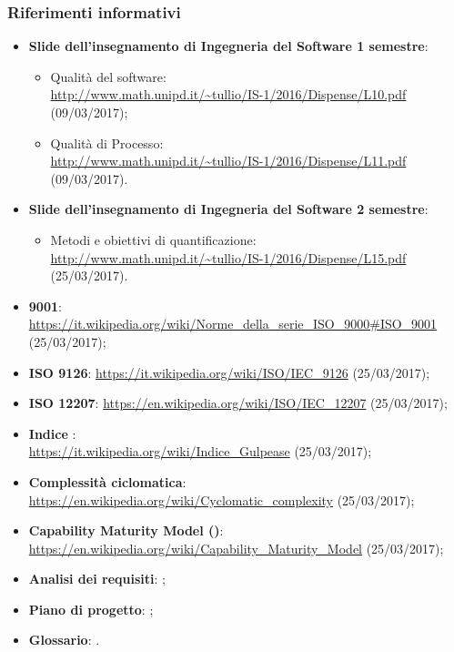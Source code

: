 \documentclass[../PianoDiQualifica.tex]{subfiles}
\begin{document}
			\subsubsection{Riferimenti informativi}	
				\begin{itemize}
					\item \textbf{Slide dell'insegnamento di Ingegneria del Software
					1 semestre}:
						\begin{itemize}
							\item Qualità del software:\\
							\url{http://www.math.unipd.it/~tullio/IS-1/2016/Dispense/L10.pdf} (09/03/2017);
							\item Qualità di Processo:\\
							\url{http://www.math.unipd.it/~tullio/IS-1/2016/Dispense/L11.pdf} (09/03/2017).
						\end{itemize}
					\item \textbf{Slide dell'insegnamento di Ingegneria del Software
					2 semestre}:
						\begin{itemize}
							\item Metodi e obiettivi di quantificazione:\\
							\url{http://www.math.unipd.it/~tullio/IS-1/2016/Dispense/L15.pdf} (25/03/2017).
						\end{itemize}
					\item \textbf{ 9001}:\\
					\url{https://it.wikipedia.org/wiki/Norme_della_serie_ISO_9000#ISO_9001} (25/03/2017);
					\item \textbf{ISO 9126}: \url{https://it.wikipedia.org/wiki/ISO/IEC_9126} (25/03/2017);
					\item \textbf{ISO 12207}: \url{https://en.wikipedia.org/wiki/ISO/IEC_12207} (25/03/2017);
					\item \textbf{Indice }:\\
					\url{https://it.wikipedia.org/wiki/Indice_Gulpease} (25/03/2017);
					\item \textbf{Complessità ciclomatica}:\\
					\url{https://en.wikipedia.org/wiki/Cyclomatic_complexity} (25/03/2017);
					\item \textbf{Capability Maturity Model ()}:\\
					\url{https://en.wikipedia.org/wiki/Capability_Maturity_Model} (25/03/2017);
					\item \textbf{Analisi dei requisiti}: \analisideirequisitiv;
					\item \textbf{Piano di progetto}: \pianodiprogettov;
					\item \textbf{Glossario}: \glossariov.
				\end{itemize}
\end{document}
